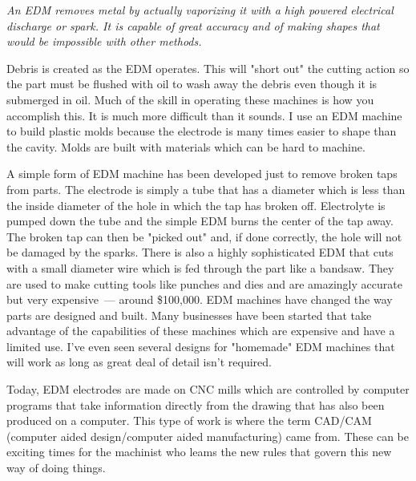 \bigskip
\textit{An EDM removes metal by actually vaporizing it with a high powered
electrical discharge or spark. It is capable of great accuracy and of making
shapes that would be impossible with other methods.}
\bigskip

Debris is created as the EDM operates. This will "short out" the cutting action
so the part must be flushed with oil to wash away the debris even though it is
submerged in oil. Much of the skill in operating these machines is how you
accomplish this. It is much more difficult than it sounds. I use an EDM machine
to build plastic molds because the electrode is many times easier to shape than
the cavity. Molds are built with materials which can be hard to machine.


A simple form of EDM machine has been developed just to remove broken taps from
parts. The electrode is simply a tube that has a diameter which is less than the
inside diameter of the hole in which the tap has broken off. Electrolyte is
pumped down the tube and the simple EDM burns the center of the tap away. The
broken tap can then be "picked out" and, if done correctly, the hole will not be
damaged by the sparks. There is also a highly sophisticated EDM that cuts with a
small diameter wire which is fed through the part like a bandsaw. They are used
to make cutting tools like punches and dies and are amazingly accurate but very
expensive\ --- around \$100,000. EDM machines have changed the way parts are
designed and built. Many businesses have been started that take advantage of the
capabilities of these machines which are expensive and have a limited use. I've
even seen several designs for "homemade" EDM machines that will work as long as
great deal of detail isn't required.


Today, EDM electrodes are made on CNC mills which are controlled by computer
programs that take information directly from the drawing that has also been
produced on a computer. This type of work is where the term CAD/CAM (computer
aided design/computer aided manufacturing) came from. These can be exciting
times for the machinist who leams the new rules that govern this new way of
doing things.

\secup

\secup

